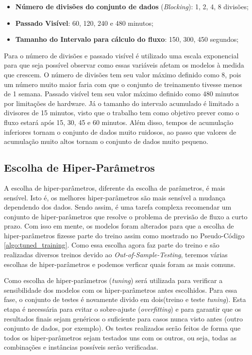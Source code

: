 \begin{itemize}
    \item \textbf{Número de divisões do conjunto de dados} (\textit{Blocking}): 1, 2, 4, 8 divisões;
    \item \textbf{Passado Visível}: 60, 120, 240 e 480 minutos;
    \item \textbf{Tamanho do Intervalo para cálculo do fluxo}: 150, 300, 450 segundos;
\end{itemize}

Para o número de divisões e passado visível é utilizado uma escala exponencial para que seja possível observar como essas variáveis afetam os modelos à medida que crescem. O número de divisões tem seu valor máximo definido como 8, pois um número muito maior faria com que o conjunto de treinamento tivesse menos de 1 semana. Passado visível tem seu valor máximo definido como 480 minutos por limitações de hardware. Já o tamanho do intervalo acumulado é limitado a divisores de 15 minutos, visto que o trabalho tem como objetivo prever como o fluxo estará após 15, 30, 45 e 60 minutos. Além disso, tempos de acumulação inferiores tornam o conjunto de dados muito ruidosos, ao passo que valores de acumulação muito altos tornam o conjunto de dados muito pequeno.

\subsection{Escolha de Hiper-Parâmetros}

A escolha de hiper-parâmetros, diferente da escolha de parâmetros, é mais sensível. Isto é, os melhores hiper-parâmetros são mais sensível a mudança dependendo dos dados. Sendo assim, é uma tarefa complexa recomendar um conjunto de hiper-parâmetros que resolve o problema de previsão de fluxo a curto prazo. Com isso em mente, os modelos foram alterados para que a escolha de hiper-parâmetros fizesse parte do treino assim como mostrado no Pseudo-Código \ref{algo:tuned_training}. Como essa escolha agora faz parte do treino e são realizadas diversos treinos devido ao \textit{Out-of-Sample-Testing}, teremos várias escolhas de hiper-parâmetros e podemos verficar quais foram as mais comuns.

Como escolha de hiper-parâmetros (\textit{tuning}) será utilizada para verificar a sensibilidade dos modelos com os hiper-parâmetros antes escolhidos. Para essa fase, o conjunto de testes é novamente divido em dois(treino e teste \textit{tuning}). Esta etapa é necessária para evitar o sobre-ajuste (\textit{overfitting}) e para garantir que os resultados finais sejam genéricos o suficiente para casos nunca visto antes (outro conjunto de dados, por exemplo). Os testes realizados serão feitos de forma que todos os hiper-parâmetros sejam testados uns com os outros, ou seja, todas as combinações e instâncias possíveis serão verificadas. 

